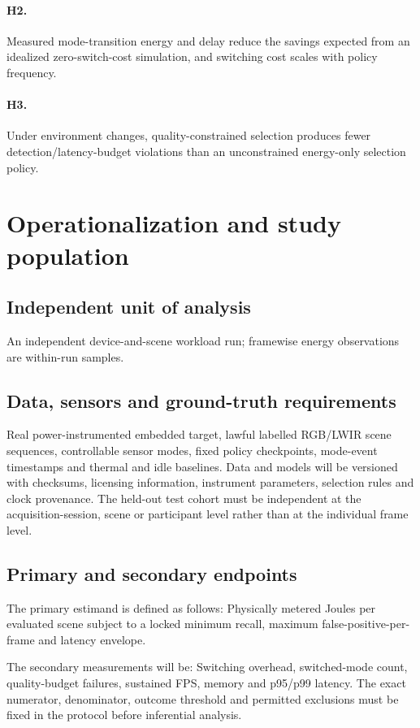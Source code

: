\documentclass[11pt,a4paper]{article}
\begin{document}
\paragraph{H2.} Measured mode-transition energy and delay reduce the savings expected from an idealized zero-switch-cost simulation, and switching cost scales with policy frequency.

\paragraph{H3.} Under environment changes, quality-constrained selection produces fewer detection/latency-budget violations than an unconstrained energy-only selection policy.

\section{Operationalization and study population}
\subsection{Independent unit of analysis}
An independent device-and-scene workload run; framewise energy observations are within-run samples.

\subsection{Data, sensors and ground-truth requirements}
Real power-instrumented embedded target, lawful labelled RGB/LWIR scene sequences, controllable sensor modes, fixed policy checkpoints, mode-event timestamps and thermal and idle baselines. Data and models will be versioned with checksums, licensing information, instrument parameters, selection rules and clock provenance. The held-out test cohort must be independent at the acquisition-session, scene or participant level rather than at the individual frame level.

\subsection{Primary and secondary endpoints}
The primary estimand is defined as follows: Physically metered Joules per evaluated scene subject to a locked minimum recall, maximum false-positive-per-frame and latency envelope.

The secondary measurements will be: Switching overhead, switched-mode count, quality-budget failures, sustained FPS, memory and p95/p99 latency. The exact numerator, denominator, outcome threshold and permitted exclusions must be fixed in the protocol before inferential analysis.
\end{document}
